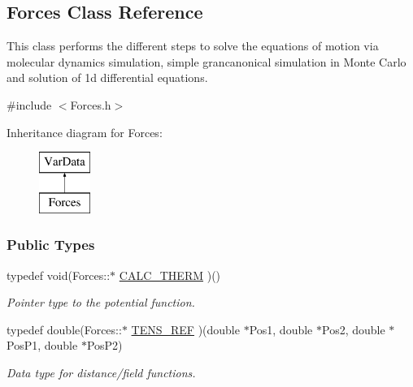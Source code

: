 \hypertarget{classForces}{\subsection{\-Forces \-Class \-Reference}
\label{classForces}
}


\-This class performs the different steps to solve the equations of motion via molecular dynamics simulation, simple grancanonical simulation in \-Monte \-Carlo and solution of 1d differential equations.  




{\ttfamily \#include $<$\-Forces.\-h$>$}

\-Inheritance diagram for \-Forces\-:\begin{figure}[H]
\begin{center}
\leavevmode
\includegraphics[height=2.000000cm]{classForces}
\end{center}
\end{figure}
\subsubsection*{\-Public \-Types}
\begin{DoxyCompactItemize}
\item 
\hypertarget{classForces_a7cc9ca7ba348e21f2e8597fc07969a51}{typedef void(\-Forces\-::$\ast$ \hyperlink{classForces_a7cc9ca7ba348e21f2e8597fc07969a51}{\-C\-A\-L\-C\-\_\-\-T\-H\-E\-R\-M} )()}\label{classForces_a7cc9ca7ba348e21f2e8597fc07969a51}

\begin{DoxyCompactList}\small\item\em \-Pointer type to the potential function. \end{DoxyCompactList}\item 
\hypertarget{classForces_ae3f1140396007efe5fb7ca46884892eb}{typedef double(\-Forces\-::$\ast$ \hyperlink{classForces_ae3f1140396007efe5fb7ca46884892eb}{\-T\-E\-N\-S\-\_\-\-R\-E\-F} )(double $\ast$\-Pos1, double $\ast$\-Pos2, double $\ast$\-Pos\-P1, double $\ast$\-Pos\-P2)}\label{classForces_ae3f1140396007efe5fb7ca46884892eb}

\begin{DoxyCompactList}\small\item\em \-Data type for distance/field functions. \end{DoxyCompactList}\end{DoxyCompactItemize}

